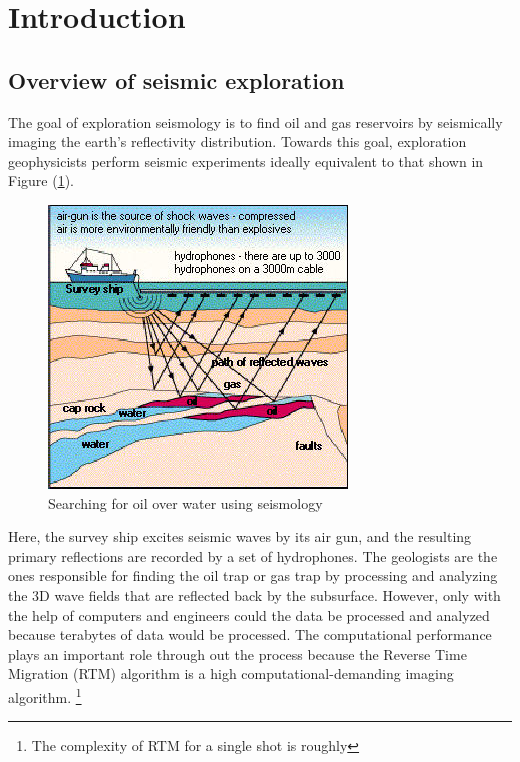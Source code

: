 
\section{Introduction}

\subsection{Overview of seismic exploration}
The goal of exploration seismology is to find oil and gas reservoirs
by seismically imaging the earth's reflectivity distribution. Towards
this goal, exploration geophysicists perform seismic experiments ideally
equivalent to that shown in Figure (\ref{fig:oil-drilling}).

\begin{figure}[h]
\centering
\includegraphics[scale=0.65]{img/oil-drilling-prospecting2.jpg}
\caption{Searching for oil over water using seismology}
\label{fig:oil-drilling}
\end{figure}

Here,
the survey ship excites seismic waves by its air gun, and the resulting
primary reflections are recorded by a set of hydrophones. The geologists
are the ones responsible for finding the oil trap or gas trap by processing
and analyzing the 3D wave fields that are reflected back by the subsurface.
However, only with the help of computers and engineers could the data
be processed and analyzed because terabytes of data would be processed.
The computational performance plays an important role through out
the process because the Reverse Time Migration (RTM) algorithm is
a high computational-demanding imaging algorithm.%
\footnote{The complexity of RTM for a single shot is roughly %
}

